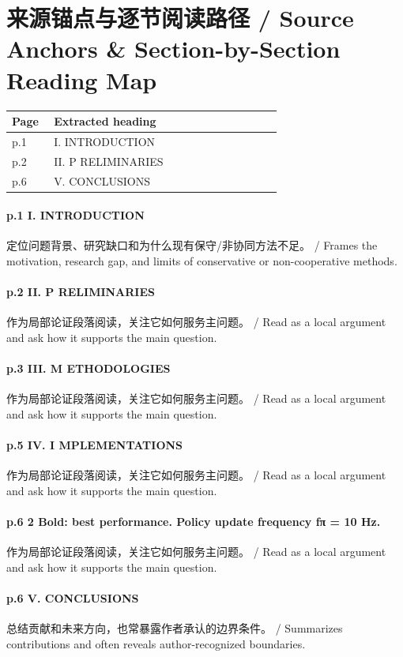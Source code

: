 \documentclass[UTF8,a4paper,11pt,fontset=fandol]{ctexart}
\begin{document}
\section{来源锚点与逐节阅读路径 / Source Anchors \& Section-by-Section Reading Map}
\begin{longtable}{p{0.14\linewidth}p{0.76\linewidth}}
\toprule
Page & Extracted heading\\
\midrule
p.1 & I. INTRODUCTION \\
p.2 & II. P RELIMINARIES \\
p.6 & V. CONCLUSIONS \\
\bottomrule
\end{longtable}

\paragraph{p.1 I. INTRODUCTION}定位问题背景、研究缺口和为什么现有保守/非协同方法不足。 / Frames the motivation, research gap, and limits of conservative or non-cooperative methods.

\paragraph{p.2 II. P RELIMINARIES}作为局部论证段落阅读，关注它如何服务主问题。 / Read as a local argument and ask how it supports the main question.

\paragraph{p.3 III. M ETHODOLOGIES}作为局部论证段落阅读，关注它如何服务主问题。 / Read as a local argument and ask how it supports the main question.

\paragraph{p.5 IV. I MPLEMENTATIONS}作为局部论证段落阅读，关注它如何服务主问题。 / Read as a local argument and ask how it supports the main question.

\paragraph{p.6 2 Bold: best performance. Policy update frequency fπ = 10 Hz.}作为局部论证段落阅读，关注它如何服务主问题。 / Read as a local argument and ask how it supports the main question.

\paragraph{p.6 V. CONCLUSIONS}总结贡献和未来方向，也常暴露作者承认的边界条件。 / Summarizes contributions and often reveals author-recognized boundaries.
\end{document}
